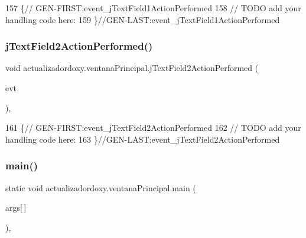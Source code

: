 \begin{DoxyCode}
157                                                                             \{\textcolor{comment}{//
      GEN-FIRST:event\_jTextField1ActionPerformed}
158         \textcolor{comment}{// TODO add your handling code here:}
159     \}\textcolor{comment}{//GEN-LAST:event\_jTextField1ActionPerformed}
\end{DoxyCode}
\mbox{\label{classactualizadordoxy_1_1ventana_principal_a1a0fec6296ff00cf7f39be7a58e37e3c}} 
\subsubsection{\texorpdfstring{j\+Text\+Field2\+Action\+Performed()}{jTextField2ActionPerformed()}}
{\footnotesize\ttfamily void actualizadordoxy.\+ventana\+Principal.\+j\+Text\+Field2\+Action\+Performed (\begin{DoxyParamCaption}\item[{java.\+awt.\+event.\+Action\+Event}]{evt }\end{DoxyParamCaption})\hspace{0.3cm}{\ttfamily [inline]}, {\ttfamily [private]}}


\begin{DoxyCode}
161                                                                             \{\textcolor{comment}{//
      GEN-FIRST:event\_jTextField2ActionPerformed}
162         \textcolor{comment}{// TODO add your handling code here:}
163     \}\textcolor{comment}{//GEN-LAST:event\_jTextField2ActionPerformed}
\end{DoxyCode}
\mbox{\label{classactualizadordoxy_1_1ventana_principal_a546323205647cde6f91ff168c86c7d0d}} 
\subsubsection{\texorpdfstring{main()}{main()}}
{\footnotesize\ttfamily static void actualizadordoxy.\+ventana\+Principal.\+main (\begin{DoxyParamCaption}\item[{String}]{args\mbox{[}$\,$\mbox{]} }\end{DoxyParamCaption})\hspace{0.3cm}{\ttfamily [inline]}, {\ttfamily [static]}}


